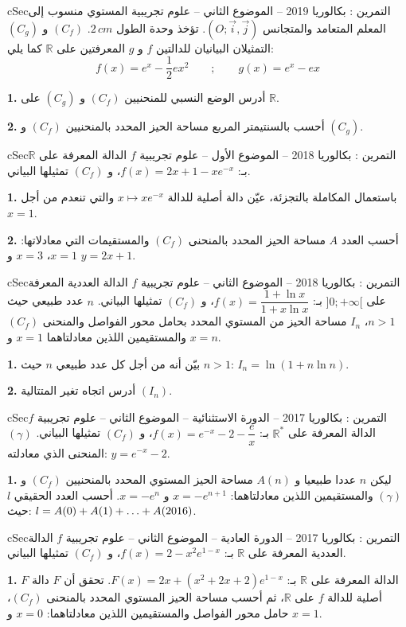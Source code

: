 \documentclass[12pt,a4paper]{article}
\newenvironment{BOX}[2]{\begin{otherlanguage}{english}\begin{arbox}{#1}{#2}}{\end{arbox}\end{otherlanguage}}
\newcounter{exo}
\newenvironment{tamrin}[1]{\stepcounter{exo}\begin{BOX}{cSec}{التمرين \theexo: #1}}{\end{BOX}}
\renewcommand{\dots}{\mathinner{\ldotp\ldotp\ldotp}}
\newcommand{\R}{\mathbb{R}}
\newcommand{\QQ}[1]{\par\smallskip\textbf{#1.} }
\begin{document}
\begin{tamrin}{بكالوريا 2019 -- الموضوع الثاني -- علوم تجريبية}
المستوي منسوب إلى المعلم المتعامد والمتجانس $(O;\vec i,\vec j)$. تؤخذ وحدة الطول $2\,cm$.
$(C_f)$ و $(C_g)$ التمثيلان البيانيان للدالتين $f$ و $g$ المعرفتين على $\R$ كما يلي:
\[f(x)=e^x-\frac12ex^2\qquad;\qquad g(x)=e^x-ex\]
\QQ{1} أدرس الوضع النسبي للمنحنيين $(C_f)$ و $(C_g)$ على $\R$.
\QQ{2} أحسب بالسنتيمتر المربع مساحة الحيز المحدد بالمنحنيين $(C_f)$ و $(C_g)$.
\end{tamrin}

\begin{tamrin}{بكالوريا 2018 -- الموضوع الأول -- علوم تجريبية}
$f$ الدالة المعرفة على $\R$ بـ: $f(x)=2x+1-xe^{-x}$، و $(C_f)$ تمثيلها البياني.
\QQ{1} باستعمال المكاملة بالتجزئة، عيّن دالة أصلية للدالة $x\mapsto xe^{-x}$ والتي تنعدم من أجل $x=1$.
\QQ{2} أحسب العدد $A$ مساحة الحيز المحدد بالمنحنى $(C_f)$ والمستقيمات التي معادلاتها: $x=1$، $x=3$ و $y=2x+1$.
\end{tamrin}

\begin{tamrin}{بكالوريا 2018 -- الموضوع الثاني -- علوم تجريبية}
$f$ الدالة العددية المعرفة على $]0;+\infty[$ بـ: $f(x)=\dfrac{1+\ln x}{1+x\ln x}$، و $(C_f)$ تمثيلها البياني.
$n$ عدد طبيعي حيث $n>1$، $I_n$ مساحة الحيز من المستوي المحدد بحامل محور الفواصل والمنحنى $(C_f)$ والمستقيمين اللذين معادلتاهما $x=1$ و $x=n$.
\QQ{1} بيّن أنه من أجل كل عدد طبيعي $n$ حيث $n>1$: $I_n=\ln(1+n\ln n)$.
\QQ{2} أدرس اتجاه تغير المتتالية $(I_n)$.
\end{tamrin}

\begin{tamrin}{بكالوريا 2017 -- الدورة الاستثنائية -- الموضوع الثاني -- علوم تجريبية}
$f$ الدالة المعرفة على $\R^*$ بـ: $f(x)=e^{-x}-2-\dfrac ex$، و $(C_f)$ تمثيلها البياني.
$(\gamma)$ المنحنى الذي معادلته: $y=e^{-x}-2$.
\QQ{1} ليكن $n$ عددا طبيعيا و $A(n)$ مساحة الحيز المستوي المحدد بالمنحنيين $(C_f)$ و $(\gamma)$ والمستقيمين اللذين معادلتاهما: $x=-e^{n+1}$ و $x=-e^n$.
أحسب العدد الحقيقي $l$ حيث: $l=A(0)+A(1)+\dots+A(2016)$.
\end{tamrin}

\begin{tamrin}{بكالوريا 2017 -- الدورة العادية -- الموضوع الثاني -- علوم تجريبية}
$f$ الدالة العددية المعرفة على $\R$ بـ: $f(x)=2-x^2e^{1-x}$، و $(C_f)$ تمثيلها البياني.
\QQ{1} $F$ الدالة المعرفة على $\R$ بـ: $F(x)=2x+(x^2+2x+2)e^{1-x}$.
تحقق أن $F$ دالة أصلية للدالة $f$ على $\R$، ثم أحسب مساحة الحيز المستوي المحدد بالمنحنى $(C_f)$، حامل محور الفواصل والمستقيمين اللذين معادلتاهما: $x=0$ و $x=1$.
\end{tamrin}
\end{document}
